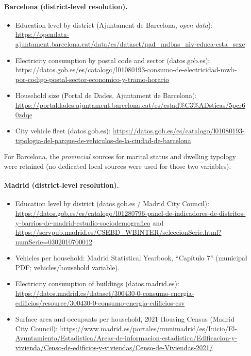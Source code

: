 \paragraph{Barcelona (district-level resolution).}
\begin{itemize}
  \item Education level by district (Ajuntament de Barcelona, \textit{open data}): \url{https://opendata-ajuntament.barcelona.cat/data/es/dataset/pad_mdbas_niv-educa-esta_sexe}
  \item Electricity consumption by postal code and sector (datos.gob.es): \url{https://datos.gob.es/es/catalogo/l01080193-consumo-de-electricidad-mwh-por-codigo-postal-sector-economico-y-tramo-horario}
  \item Household size (Portal de Dades, Ajuntament de Barcelona): \url{https://portaldades.ajuntament.barcelona.cat/es/estad%C3%ADsticas/5pcr60zdqe}
  \item City vehicle fleet (datos.gob.es): \url{https://datos.gob.es/es/catalogo/l01080193-tipologia-del-parque-de-vehiculos-de-la-ciudad-de-barcelona}
\end{itemize}
For Barcelona, the \emph{provincial} sources for marital status and dwelling typology were retained (no dedicated local sources were used for those two variables).

\paragraph{Madrid (district-level resolution).}
\begin{itemize}
  \item Education level by district (datos.gob.es / Madrid City Council): \url{https://datos.gob.es/es/catalogo/l01280796-panel-de-indicadores-de-distritos-y-barrios-de-madrid-estudio-sociodemografico} and \url{https://servpub.madrid.es/CSEBD_WBINTER/seleccionSerie.html?numSerie=0302010700012}
  \item Vehicles per household: Madrid Statistical Yearbook, ``Capítulo 7'' (municipal PDF; vehicles/household variable).
  \item Electricity consumption of buildings (datos.madrid.es): \url{https://datos.madrid.es/dataset/300430-0-consumo-energia-edificios/resource/300430-0-consumo-energia-edificios-csv}
  \item Surface area and occupants per household, 2021 Housing Census (Madrid City Council): \url{https://www.madrid.es/portales/munimadrid/es/Inicio/El-Ayuntamiento/Estadistica/Areas-de-informacion-estadistica/Edificacion-y-vivienda/Censo-de-edificios-y-viviendas/Censo-de-Viviendas-2021/}
\end{itemize}

